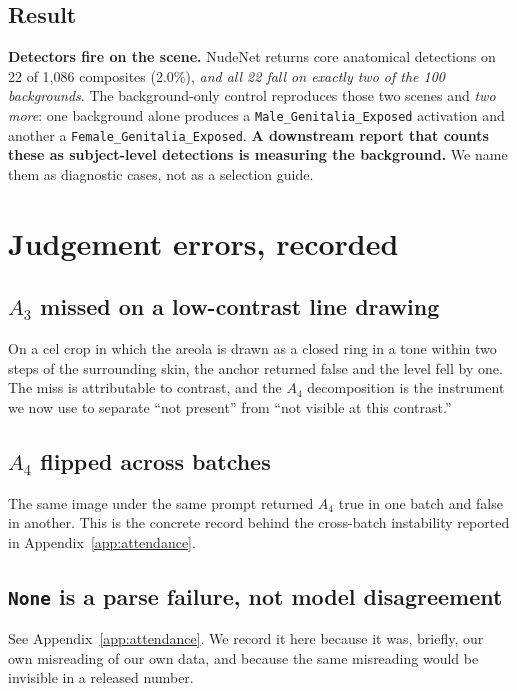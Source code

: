 \subsection{Result}

\textbf{Detectors fire on the scene.} NudeNet returns core anatomical
detections on 22 of 1{,}086 composites (2.0\%), \emph{and all 22 fall on exactly
two of the 100 backgrounds}. The background-only control reproduces those two
scenes and \emph{two more}: one background alone produces a
\texttt{Male\_Genitalia\_Exposed} activation and another a
\texttt{Female\_Genitalia\_Exposed}. \textbf{A downstream report that counts
these as subject-level detections is measuring the background.} We name them
as diagnostic cases, not as a selection guide.

\section{Judgement errors, recorded}
\label{app:errors}

\subsection{$A_3$ missed on a low-contrast line drawing}

On a cel crop in which the areola is drawn as a closed ring in a tone within
two steps of the surrounding skin, the anchor returned false and the level fell
by one. The miss is attributable to contrast, and the $A_4$ decomposition
is the instrument we now use to separate ``not present''
from ``not visible at this contrast.''

\subsection{$A_4$ flipped across batches}

The same image under the same prompt returned $A_4$ true in one batch and false
in another. This is the concrete record behind the cross-batch instability
reported in Appendix~\ref{app:attendance}.

\subsection{\texttt{None} is a parse failure, not model disagreement}

See Appendix~\ref{app:attendance}. We record it here because it was, briefly, our own
misreading of our own data, and because the same misreading would be invisible
in a released number.

